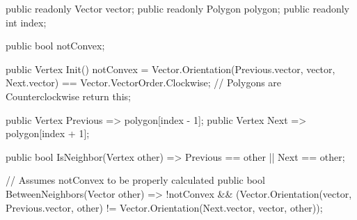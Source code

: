 \documentclass[12pt]{article}
\begin{document}
\begin{Csharp}[caption=class Vertex]
public readonly Vector vector;
public readonly Polygon polygon;
public readonly int index;

public bool notConvex;

public Vertex Init()
{
    notConvex = Vector.Orientation(Previous.vector, vector, Next.vector) == Vector.VectorOrder.Clockwise; // Polygons are Counterclockwise
    return this;
}

public Vertex Previous => polygon[index - 1];
public Vertex Next => polygon[index + 1];

public bool IsNeighbor(Vertex other) => Previous == other || Next == other;

// Assumes notConvex to be properly calculated
public bool BetweenNeighbors(Vector other) =>
    !notConvex && (Vector.Orientation(vector, Previous.vector, other) != Vector.Orientation(Next.vector, vector, other));
\end{Csharp}
\end{document}
